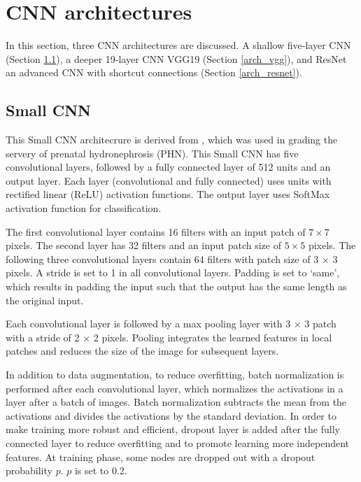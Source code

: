 \chapter{CNN architectures} 
\label{cnn_architectures}
In this section, three CNN architectures are discussed. A shallow five-layer CNN (Section \ref{arch_small}), a deeper 19-layer CNN VGG19 (Section \ref{arch_vgg}), and ResNet an advanced CNN with shortcut connections (Section \ref{arch_resnet}).

\section{Small CNN}
\label{arch_small}
This Small CNN architecrure is derived from \cite{Dhindsa2018}, which was used in grading the servery of prenatal hydronephrosis (PHN). This Small CNN has five convolutional layers, followed by a fully connected layer of 512 units and an output layer. Each layer (convolutional and fully connected) uses units with rectified linear (ReLU) activation functions. The output layer uses SoftMax activation function for classification. 

The first convolutional layer contains 16 filters with an input patch of $7 \times 7$ pixels. The second layer has 32 filters and an input patch size of $5 \times 5$ pixels. The following three convolutional layers contain 64 filters with patch size of 3 $\times$ 3 pixels. A stride is set to 1 in all convolutional layers. Padding is set to ‘same’, which results in padding the input such that the output has the same length as the original input.

Each convolutional layer is followed by a max pooling layer with 3 $\times$ 3 patch with a stride of 2 $\times$ 2 pixels. Pooling integrates the learned features in local patches and reduces the size of the image for subsequent layers. 

In addition to data augmentation, to reduce overfitting, batch normalization is performed after each convolutional layer, which normalizes the activations in a layer after a batch of images. Batch normalization subtracts the mean from the activations and divides the activations by the standard deviation. In order to make training more robust and efficient, dropout layer is added after the fully connected layer to reduce overfitting and to promote learning more independent features. At training phase, some nodes are dropped out with a dropout probability $p$. $p$ is set to 0.2.

